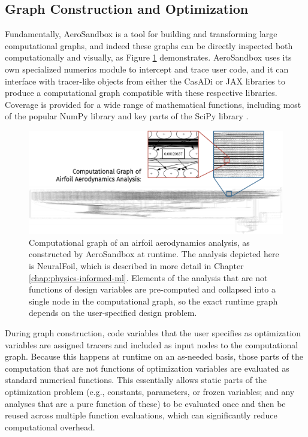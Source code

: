 \subsection{Graph Construction and Optimization}

Fundamentally, AeroSandbox is a tool for building and transforming large computational graphs, and indeed these graphs can be directly inspected both computationally and visually, as Figure \ref{fig:computational-graph-aerosandbox} demonstrates. AeroSandbox uses its own specialized numerics module to intercept and trace user code, and it can interface with tracer-like objects from either the CasADi \cite{casadi} or JAX \cite{jax} libraries to produce a computational graph compatible with these respective libraries. Coverage is provided for a wide range of mathematical functions, including most of the popular NumPy library \cite{harris_array_2020} and key parts of the SciPy library \cite{scipy}.

\begin{figure}[h]
    \centering
    \includegraphics[width=\textwidth]{../figures/large_computational_graph-crop.pdf} %
    \caption{Computational graph of an airfoil aerodynamics analysis, as constructed by AeroSandbox at runtime. The analysis depicted here is NeuralFoil, which is described in more detail in Chapter \ref{chap:physics-informed-ml}. Elements of the analysis that are not functions of design variables are pre-computed and collapsed into a single node in the computational graph, so the exact runtime graph depends on the user-specified design problem.}
    \label{fig:computational-graph-aerosandbox}
\end{figure}

During graph construction, code variables that the user specifies as optimization variables are assigned tracers and included as input nodes to the computational graph. Because this happens at runtime on an as-needed basis, those parts of the computation that are not functions of optimization variables are evaluated as standard numerical functions. This essentially allows static parts of the optimization problem (e.g., constants, parameters, or frozen variables; and any analyses that are a pure function of these) to be evaluated once and then be reused across multiple function evaluations, which can significantly reduce computational overhead.

